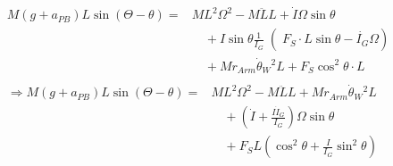 \documentclass[a4paper,11pt]{jsarticle}
\begin{document}
\begin{align}
  \begin{aligned}
    M(g+a_{PB}) L\sin(\Theta - \theta)
    =&
    ML^2\Omega^2 - M\ddot{L}L 
    + \dot{I}\Omega \sin\theta 
    \\
    &\quad + I\sin\theta
    \left.\frac{1}{I_G}\middle(
      F_S \cdot L\sin\theta
      -\dot{I_G}\Omega
    \right)
    \\
    &\quad + Mr_{Arm}\dot{\theta}_W{}^2L + F_S\cos^2\theta \cdot L
  \end{aligned}
  \\
  \begin{aligned}
    \Rightarrow
    M(g+a_{PB}) L\sin(\Theta - \theta)
    =&
    ML^2\Omega^2 - M\ddot{L}L
    + Mr_{Arm}\dot{\theta}_W{}^2L 
    \\
    &\quad
    + \left(
      \dot{I} + \frac{I\dot{I}_G}{I_G}
    \right)
    \Omega\sin\theta
    \\
    &\quad
    + F_S L\left(
      \cos^2\theta + \frac{I}{I_G}\sin^2\theta
    \right)
  \end{aligned}
\end{align}
\end{document}
